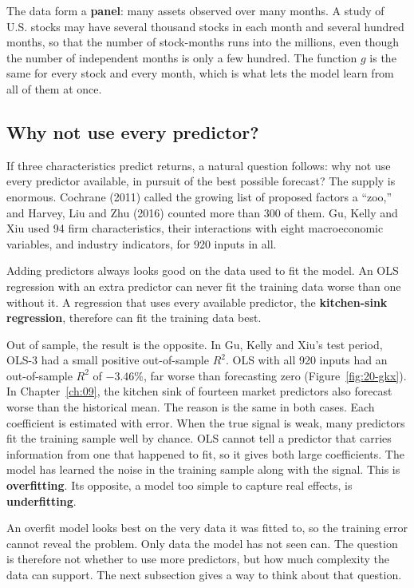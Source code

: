 The data form a \textbf{panel}: many assets observed over many months. A study of U.S. stocks may have several thousand stocks in each month and several hundred months, so that the number of stock-months runs into the millions, even though the number of independent months is only a few hundred. The function $g$ is the same for every stock and every month, which is what lets the model learn from all of them at once.

\subsection{Why not use every predictor?}
\label{sec:20-why}

If three characteristics predict returns, a natural question follows: why not use every predictor available, in pursuit of the best possible forecast? The supply is enormous. 
Cochrane (2011) called the growing list of proposed factors a ``zoo,'' and Harvey, Liu and Zhu (2016) counted more than 300 of them.
Gu, Kelly and Xiu used 94 firm characteristics, their interactions with eight macroeconomic variables, and industry indicators, for 920 inputs in all.

Adding predictors always looks good on the data used to fit the model. An OLS regression with an extra predictor can never fit the training data worse than one without it. A regression that uses every available predictor, the \textbf{kitchen-sink regression}, therefore can fit the training data best.

Out of sample, the result is the opposite. In Gu, Kelly and Xiu's test period, OLS-3 had a small positive out-of-sample $R^2$. OLS with all 920 inputs had an out-of-sample $R^2$ of $-3.46\%$, far worse than forecasting zero (Figure~\ref{fig:20-gkx}). In Chapter~\ref{ch:09}, the kitchen sink of fourteen market predictors also forecast worse than the historical mean. The reason is the same in both cases. Each coefficient is estimated with error. When the true signal is weak, many predictors fit the training sample well by chance. OLS cannot tell a predictor that carries information from one that happened to fit, so it gives both large coefficients. The model has learned the noise in the training sample along with the signal. This is \textbf{overfitting}. Its opposite, a model too simple to capture real effects, is \textbf{underfitting}.

An overfit model looks best on the very data it was fitted to, so the training error cannot reveal the problem. Only data the model has not seen can. The question is therefore not whether to use more predictors, but how much complexity the data can support. The next subsection gives a way to think about that question.

